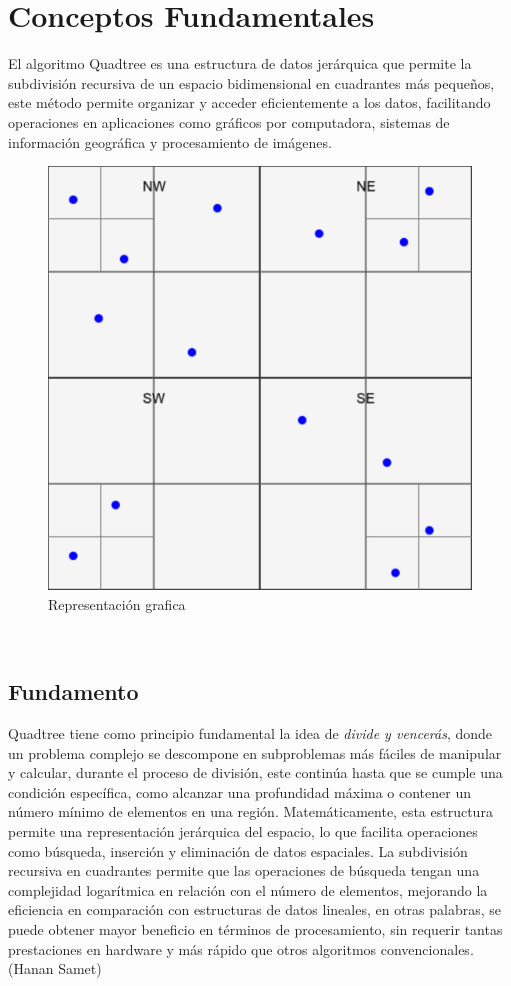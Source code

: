 \documentclass[9pt,a4paper,twoside]{rho-class/rho}
\begin{document}
    \section{ Conceptos Fundamentales }
    El algoritmo Quadtree es una estructura de datos jerárquica que permite la subdivisión recursiva de un espacio bidimensional en cuadrantes más pequeños, este método permite organizar y acceder eficientemente a los datos, facilitando operaciones en aplicaciones como gráficos por computadora, sistemas de información geográfica y procesamiento de imágenes.
    \begin{figure}[h]
        \centering
        \includegraphics[width=\linewidth]{figures/quadtree.pdf}
        \caption{Representación grafica}
        \label{fig:representation_figure}
    \end{figure}\\
        \subsection{Fundamento}
            Quadtree tiene como principio fundamental la idea de \textit{divide y vencerás}, donde un problema complejo se descompone en subproblemas más fáciles de manipular y calcular, durante el proceso de división, este continúa hasta que se cumple una condición específica, como alcanzar una profundidad máxima o contener un número mínimo de elementos en una región.
            Matemáticamente, esta estructura permite una representación jerárquica del espacio, lo que facilita operaciones como búsqueda, inserción y eliminación de datos espaciales. La subdivisión recursiva en cuadrantes permite que las operaciones de búsqueda tengan una complejidad logarítmica en relación con el número de elementos, mejorando la eficiencia en comparación con estructuras de datos lineales, en otras palabras, se puede obtener mayor beneficio en términos de procesamiento, sin requerir tantas prestaciones en hardware y más rápido que otros algoritmos convencionales. (Hanan Samet)
\end{document}

